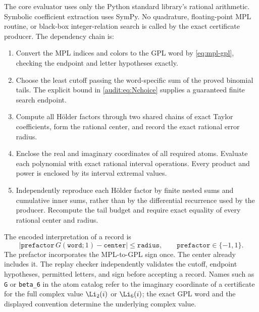 The core evaluator uses only the Python standard library's rational
arithmetic. Symbolic coefficient extraction uses SymPy. No quadrature,
floating-point MPL routine, or black-box integer-relation search is
called by the exact certificate producer. The dependency chain is:
\begin{enumerate}
\item Convert the MPL indices and colors to the GPL word by
\eqref{eq:mpl-gpl}, checking the endpoint and letter hypotheses exactly.
\item Choose the least cutoff passing the word-specific sum of the
proved binomial tails. The explicit bound in
\eqref{audit:eq:Nchoice} supplies a guaranteed finite search endpoint.
\item Compute all H\"older factors through two shared chains of exact
Taylor coefficients, form the rational center, and record the exact
rational error radius.
\item Enclose the real and imaginary coordinates of all required atoms.
Evaluate each polynomial with exact rational interval operations.
Every product and power is enclosed by its interval extremal values.
\item Independently reproduce each H\"older factor by finite nested
sums and cumulative inner sums, rather than by the differential
recurrence used by the producer. Recompute the tail budget and require
exact equality of every rational center and radius.
\end{enumerate}

The encoded interpretation of a record is
\[
 \left|\texttt{prefactor}\,G(\texttt{word};1)
                 -\texttt{center}\right|\le\texttt{radius},
 \qquad\texttt{prefactor}\in\{-1,1\}.
\]
The prefactor incorporates the MPL-to-GPL sign once. The center already
includes it. The replay checker independently validates the cutoff,
endpoint hypotheses, permitted letters, and sign before accepting a
record. Names such as \texttt{G} or \texttt{beta\_6} in the atom catalog
refer to the imaginary coordinate of a certificate for the full
complex value $\Li_2(i)$ or $\Li_6(i)$; the exact GPL word and the
displayed convention determine the underlying complex value.

